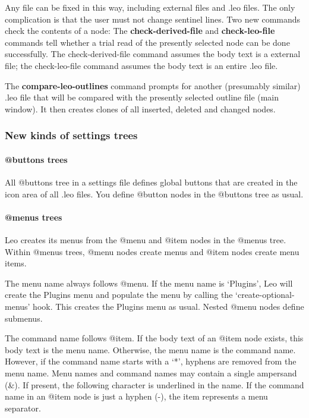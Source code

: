 \documentclass[a4paper,10pt,english]{sphinxmanual}
\begin{document}
Any file can be fixed in this way, including external files and .leo files. The
only complication is that the user must not change sentinel lines. Two new
commands check the contents of a node: The \textbf{check-derived-file} and
\textbf{check-leo-file} commands tell whether a trial read of the presently selected
node can be done successfully. The check-derived-file command assumes the body
text is a external file; the check-leo-file command assumes the body text is an
entire .leo file.

The \textbf{compare-leo-outlines} command prompts for another (presumably similar)
.leo file that will be compared with the presently selected outline file (main
window). It then creates clones of all inserted, deleted and changed nodes.


\subsubsection{New kinds of settings trees}
\label{what-is-new:new-kinds-of-settings-trees}

\paragraph{@buttons trees}
\label{what-is-new:buttons-trees}
All @buttons tree in a settings file defines global buttons that are created in
the icon area of all .leo files. You define @button nodes in the @buttons tree
as usual.


\paragraph{@menus trees}
\label{what-is-new:menus-trees}
Leo creates its menus from the @menu and @item nodes in the @menus tree. Within
@menus trees, @menu nodes create menus and @item nodes create menu items.

The menu name always follows @menu. If the menu name is `Plugins', Leo will
create the Plugins menu and populate the menu by calling the
`create-optional-menus' hook. This creates the Plugins menu as usual. Nested
@menu nodes define submenus.

The command name follows @item. If the body text of an @item node exists, this
body text is the menu name. Otherwise, the menu name is the command name.
However, if the command name starts with a `*', hyphens are removed from the
menu name. Menu names and command names may contain a single ampersand (\&). If
present, the following character is underlined in the name. If the command name
in an @item node is just a hyphen (-), the item represents a menu separator.
\end{document}
